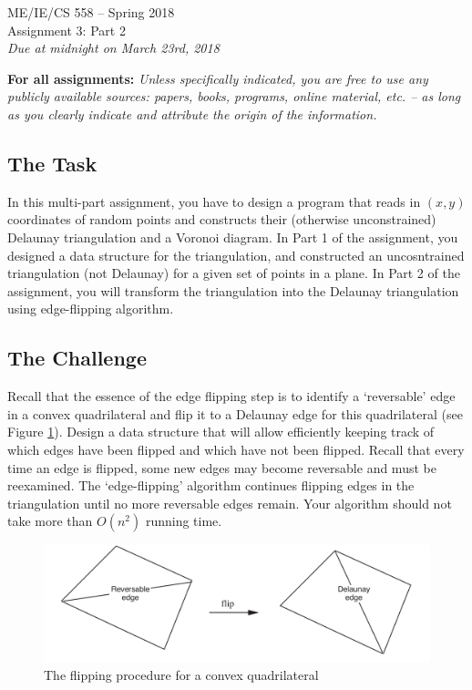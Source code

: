 \documentclass[11pt]{article}
\begin{document}
\begin{center}
{\Large ME/IE/CS 558 -- Spring 2018}\\ \vspace{12pt} {\large
Assignment 3:  Part 2}\\ \vspace{12pt} {\em Due at midnight on March 23rd, 2018}
\end{center}

{\bf For all assignments:} {\em Unless specifically indicated, you
are free to use any publicly available sources: papers, books,
programs, online material, etc. -- as long as you clearly indicate
and attribute the origin of the information.}

\subsection*{The Task}

In this multi-part assignment, you have to design a program that reads in
$(x,y)$ coordinates of random points and constructs their (otherwise 
unconstrained) Delaunay triangulation and a Voronoi diagram.  
In Part 1 of the assignment, you  designed a data structure for the triangulation, 
and constructed an uncosntrained triangulation (not Delaunay) for a given set of points in a plane.  
In Part 2 of the assignment, you will transform the triangulation into the Delaunay triangulation using edge-flipping algorithm.


\subsection*{The Challenge}



Recall that the essence of the edge flipping step is to
identify a `reversable' edge in a convex quadrilateral and flip it
to a Delaunay edge for this quadrilateral (see Figure \ref{fig:quad}).
Design a data structure that will allow efficiently keeping track
of which edges have been flipped and which have not been flipped.
Recall that every time an edge is flipped, some new edges may
become reversable and must be reexamined.  The `edge-flipping'
algorithm continues flipping edges in the triangulation until no
more reversable edges remain. Your algorithm should not take more
than $O(n^2)$ running time.

\begin{figure}[tbh]
\centering
\includegraphics[scale=0.3]{quad.png}
\caption{The flipping procedure for a convex quadrilateral}
\label{fig:quad}
\end{figure}
\end{document}

